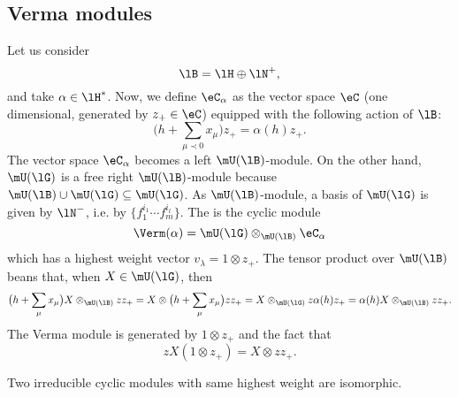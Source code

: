                     \subsection{Verma modules}

Let us consider
\begin{equation}
    \lB=\lH\oplus\lN^+,
\end{equation}
and take $\alpha\in\lH^*$. Now, we define $\eC_{\alpha}$ as the vector space $\eC$ (one dimensional, generated by $z_+\in\eC$) equipped with the following action of $\lB$:
\begin{equation}
    \big( h+\sum_{\mu\prec 0}x_{\mu} \big)z_+=\alpha(h)z_+.
\end{equation}
The vector space $\eC_{\alpha}$ becomes a left $\mU(\lB)$-module. On the other hand, $\mU(\lG)$ is a free right $\mU(\lB)$-module because $\mU(\lB)\cup\mU(\lG)\subseteq\mU(\lG)$. As $\mU(\lB)$-module, a basis of $\mU(\lG)$ is given by $\lN^-$, i.e. by $\{ f_1^{i_1}\cdots f_m^{i_l} \}$. The  is the cyclic module
\begin{equation}
    \Verm(\alpha)=\mU(\lG)\otimes_{\mU(\lB)}\eC_{\alpha}
\end{equation}
which has a highest weight vector $v_{\lambda}=1\otimes z_+$. The tensor product over $\mU(\lB)$ beans that, when $X\in\mU(\lG)$, then
\begin{equation}
    \big( h+\sum_{\mu}x_{\mu} \big)X\otimes_{\mU(\lB)}zz_+=X\otimes\big( h+\sum_{\mu}x_{\mu} \big)zz_+=X\otimes_{\mU(\lG)}z\alpha(h)z_+=\alpha(h)X\otimes_{\mU(\lB)}zz_+.
\end{equation}
The Verma module is generated by $1\otimes z_+$ and the fact that
\begin{equation}
    zX(1\otimes z_+)=X\otimes zz_+.
\end{equation}

\begin{proposition}
Two irreducible cyclic modules with same highest weight are isomorphic.
\end{proposition}

